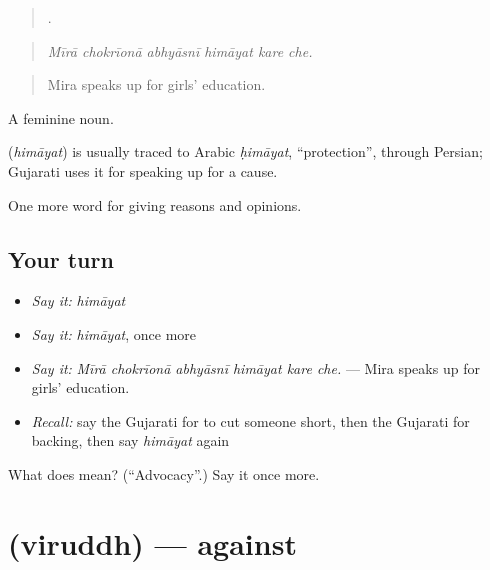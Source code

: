 \begin{quote}
     .
\end{quote}

\begin{quote}
\emph{Mīrā chokrīonā abhyāsnī himāyat kare che.}
\end{quote}

\begin{quote}
Mira speaks up for girls' education.
\end{quote}

A feminine noun.

\begin{cousinweb}
\textbf{} (\emph{himāyat}) is usually traced to Arabic \emph{ḥimāyat}, \textquotedblleft{}protection\textquotedblright{}, through Persian; Gujarati uses it for speaking up for a cause.
\end{cousinweb}

\begin{grammarlens}[title={What you've built}]
One more word for giving reasons and opinions.
\end{grammarlens}

\subsection*{Your turn}
\begin{itemize}
\raggedright
  \item \emph{Say it:} \emph{himāyat}
  \item \emph{Say it:} \emph{himāyat}, once more
  \item \emph{Say it:} \emph{Mīrā chokrīonā abhyāsnī himāyat kare che.} — Mira speaks up for girls' education.
  \item \emph{Recall:} say the Gujarati for to cut someone short, then the Gujarati for backing, then say \emph{himāyat} again
\end{itemize}

\begin{tcolorbox}[breakable,colback=teal!4,colframe=teal!35!black,title={Before you move on}]
What does  mean? (\textquotedblleft{}Advocacy\textquotedblright{}.) Say it once more.
\end{tcolorbox}
\section[\texorpdfstring{\gu{વિરુદ્ધ} (viruddh)}{વિરુદ્ધ (viruddh)}]{ (viruddh) — against}


